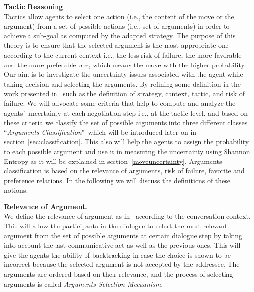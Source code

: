 \textbf{Tactic Reasoning} \\
Tactics allow agents to select one action (i.e., the content of the move or the argument) from a set of possible actions (i.e., set of
arguments) in order to achieve a sub-goal as computed by the adapted strategy. The purpose of this theory is to ensure that the selected argument
is the most appropriate one according to the current context i.e., the less risk of failure, the more favorable and the more preferable one,
which means the move with the higher probability. Our aim is to investigate the uncertainty issues associated with the agent while taking decision
and selecting the arguments. By refining some definition in the work presented in~\cite{Mbarki06} such as the definition of strategy, context,
tactic, and risk of failure. We will advocate some criteria that help to compute and analyze the agents' uncertainty at each negotiation step i.e., at
the tactic level. and based on these criteria we classify the set of possible arguments into three different classes ``\textit{Arguments Classification}",
which will be introduced later on in section~\ref{sec:classification}. This also will help the agents to assign the probability to each possible argument
and use it in measuring the uncertainty using Shannon Entropy as it will be explained in section~\ref{moveuncertainty}. Arguments classification is based
on the relevance of arguments, risk of failure, favorite and preference relations. In the following we will discuss the definitions of these notions.

\textbf{Relevance of Argument.} \\
We define the relevance of argument as in~\cite{Mbarki06} according to the conversation context. This will allow the participants in the dialogue to
select the most relevant argument from the set of possible arguments at certain dialogue step by taking into account the last communicative act as well as the
previous ones. This will give the agents the ability of backtracking in case the choice is shown to be incorrect because the selected argument is not accepted
by the addressee. The arguments are ordered based on their relevance, and the process of selecting arguments is called \emph{Arguments Selection Mechanism}.


